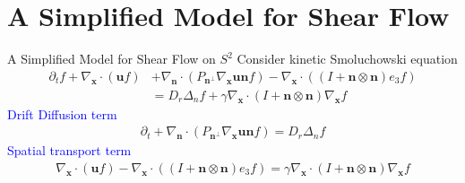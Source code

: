 \section{A Simplified Model for Shear Flow}
\begin{frame}{A Simplified Model for Shear Flow on $S^2$}
	\scriptsize
Consider kinetic Smoluchowski equation
\begin{align*}
	\partial_t f+\nabla_{\boldsymbol{x}} \cdot(\boldsymbol{u} f) & +\nabla_{\boldsymbol{n}} \cdot\left(P_{\boldsymbol{n}^{\perp}} \nabla_{\boldsymbol{x}} \boldsymbol{u} \boldsymbol{n} f\right)-\nabla_{\boldsymbol{x}} \cdot\left((I+\boldsymbol{n} \otimes \boldsymbol{n}) e_3 f\right) \\
	& =D_r \Delta_n f+\gamma \nabla_{\boldsymbol{x}} \cdot(I+\boldsymbol{n} \otimes \boldsymbol{n}) \nabla_{\boldsymbol{x}} f
\end{align*}
	\pause
\textcolor{blue}{Drift Diffusion term}
\begin{align*}
	\partial_t +\nabla_{\boldsymbol{n}} \cdot\left(P_{\boldsymbol{n}^{\perp}}\nabla_{\boldsymbol{x}} \boldsymbol{u} \boldsymbol{n} f\right) =D_r \Delta_n f
\end{align*}
	\pause
\textcolor{blue}{Spatial transport term}
\begin{align*}
	\nabla_{\boldsymbol{x}} \cdot(\boldsymbol{u} f) -\nabla_{\boldsymbol{x}} \cdot\left((I+\boldsymbol{n} \otimes \boldsymbol{n}) e_3 f\right) = \gamma \nabla_{\boldsymbol{x}} \cdot(I+\boldsymbol{n} \otimes \boldsymbol{n}) \nabla_{\boldsymbol{x}} f
\end{align*}
\end{frame}


